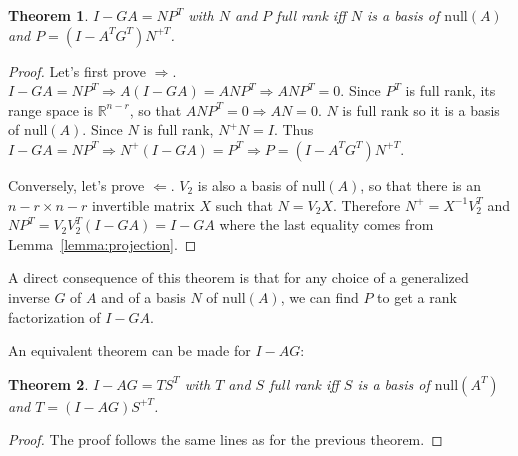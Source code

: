 \documentclass[]{article}
\newtheorem{theorem}{Theorem}[section]
\theoremstyle{definition}
\begin{document}
\begin{theorem}
\label{th:NP}
  $I-GA = N P^T$ with $N$ and $P$ full rank iff $N$ is a basis of $\mathrm{null}(A)$ and $P = (I-A^TG^T)N^{+T}$.
\end{theorem}
\begin{proof}
  Let's first prove $\Longrightarrow$.
	\newline
	$I-GA = N P^T \Longrightarrow A(I-GA) = A N P^T \Longrightarrow ANP^T=0$. Since $P^T$ is full rank, its range space is $\mathbb{R}^{n-r}$, so that $ANP^T=0 \Longrightarrow AN = 0$. $N$ is full rank so it is a basis of $\mathrm{null}(A)$.
\newline	
	Since $N$ is full rank, $N^+ N = I$. Thus $I-GA = N P^T \Longrightarrow N^+(I-GA) = P^T \Longrightarrow P = (I-A^TG^T)N^{+T}$.
	
	Conversely, let's prove $\Longleftarrow$.
  \newline
	$V_2$ is also a basis of $\mathrm{null}(A)$, so that there is an $n-r \times n-r$ invertible matrix $X$ such that $N = V_2 X$. Therefore $N^+ = X^{-1} V_2^T$ and $N P^T = V_2 V_2^T (I-GA) = I-GA$ where the last equality comes from Lemma~\ref{lemma:projection}.
\end{proof}
A direct consequence of this theorem is that for any choice of a generalized inverse $G$ of $A$ and of a basis $N$ of $\mathrm{null}(A)$, we can find $P$ to get a rank factorization of $I-GA$.

An equivalent theorem can be made for $I-AG$:
\begin{theorem}
\label{th:TS}
  $I-AG = T S^T$ with $T$ and $S$ full rank iff $S$ is a basis of $\mathrm{null}(A^T)$ and $T = (I-AG)S^{+T}$.
\end{theorem}
\begin{proof}
	The proof follows the same lines as for the previous theorem.
\end{proof}
\end{document}
